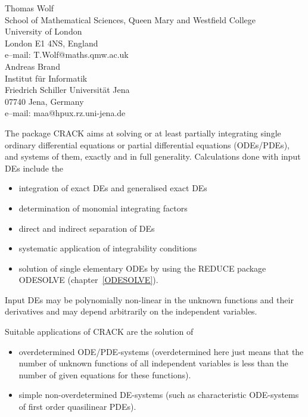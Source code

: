 \documentclass[11pt,letterpaper]{book}
\makeatletter
\newcommand{\underscore}{\_}
\newcommand{\ttindex}[1]{{\renewcommand{\_}{\protect\underscore}%
                          \index{#1@{\tt #1}}}}
\makeatother
\begin{document}
{\footnotesize
\begin{center}
Thomas Wolf \\
School of Mathematical Sciences, Queen Mary and Westfield College \\
University of London \\
London E1 4NS, England \\[0.05in]
e--mail: T.Wolf@maths.qmw.ac.uk \\ [0.10in]
Andreas Brand \\
Institut f\"{u}r Informatik \\
Friedrich Schiller Universit\"{a}t Jena \\
07740 Jena, Germany \\[0.05in]
e--mail: maa@hpux.rz.uni-jena.de
\end{center}
}

\ttindex{CRACK}
The package CRACK aims at solving or at least partially
integrating single ordinary differential equations or partial
differential equations (ODEs/PDEs), and systems of them, exactly and in full
generality.  Calculations done with input DEs include the
\begin{itemize}
\item integration of exact DEs and generalised exact DEs
\item determination of monomial integrating factors
\item direct and indirect separation of DEs
\item systematic application of integrability conditions
\item solution of single elementary ODEs by using the REDUCE
      package ODESOLVE (chapter~\ref{ODESOLVE}).
\end{itemize}
Input DEs may be polynomially non-linear in the unknown functions
and their derivatives and may depend arbitrarily on the independent
variables.

Suitable applications of CRACK are the solution of
\begin{itemize}
\item overdetermined ODE/PDE-systems (overdetermined here just means
that the number of unknown functions of all independent variables
is less than the number of given equations for these functions).
\item simple non-overdetermined DE-systems (such as characteristic
ODE-systems of first order quasilinear PDEs).
\end{itemize}
\end{document}
